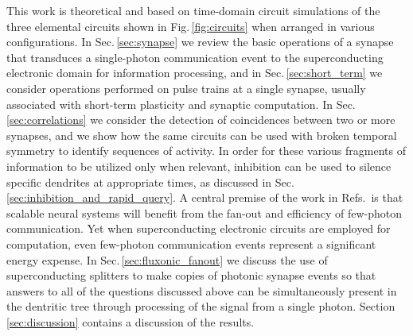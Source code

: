 \documentclass[twocolumn]{article}
\begin{document}
This work is theoretical and based on time-domain circuit simulations of the three elemental circuits shown in Fig.\,\ref{fig:circuits} when arranged in various configurations. In Sec.\,\ref{sec:synapse} we review the basic operations of a synapse that transduces a single-photon communication event to the superconducting electronic domain for information processing, and in Sec.\,\ref{sec:short_term} we consider operations performed on pulse trains at a single synapse, usually associated with short-term plasticity and synaptic computation. In Sec.\,\ref{sec:correlations} we consider the detection of coincidences between two or more synapses, and we show how the same circuits can be used with broken temporal symmetry to identify sequences of activity. In order for these various fragments of information to be utilized only when relevant, inhibition can be used to silence specific dendrites at appropriate times, as discussed in Sec.\,\ref{sec:inhibition_and_rapid_query}. A central premise of the work in Refs.\,\cite{shbu2017,sh2018,sh2018_full,sh2018_ICRC} is that scalable neural systems will benefit from the fan-out and efficiency of few-photon communication. Yet when superconducting electronic circuits are employed for computation, even few-photon communication events represent a significant energy expense. In Sec.\,\ref{sec:fluxonic_fanout} we discuss the use of superconducting splitters to make copies of photonic synapse events so that answers to all of the questions discussed above can be simultaneously present in the dentritic tree through processing of the signal from a single photon. Section \ref{sec:discussion} contains a discussion of the results.
\end{document}
